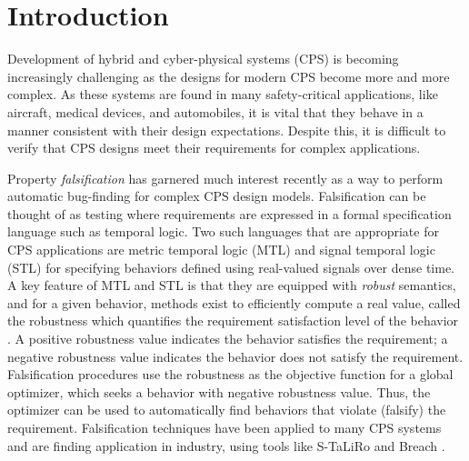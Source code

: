 \section{Introduction} \label{sec:introduction}

Development of hybrid and cyber-physical systems (CPS) is becoming
increasingly challenging as the designs for modern CPS become more and
more complex.  As these systems are found in many safety-critical
applications, like aircraft, medical devices, and automobiles, it is
vital that they behave in a manner consistent with their
design expectations. Despite this, it is difficult to verify that CPS
designs meet their requirements for complex applications.

Property \emph{falsification} has garnered much interest recently as a
way to perform automatic bug-finding for complex CPS design
models. Falsification can be thought of as testing where requirements
are expressed in a formal specification language such as temporal
logic.  Two such languages that are appropriate for CPS applications
are metric temporal logic (MTL) and signal temporal logic (STL)
\cite{Koymans1990,MalerN04} for specifying behaviors defined using
real-valued signals over dense time. A key feature of MTL and STL is
that they are equipped with \emph{robust} semantics, and for a given
behavior, methods exist to efficiently compute a real value, called
the robustness which quantifies the requirement satisfaction level of
the behavior \cite{FainekosP06fates,DonzeM10}. A positive robustness
value indicates the behavior satisfies the requirement; a negative
robustness value indicates the behavior does not satisfy the
requirement. Falsification procedures use the robustness as the
objective function for a global optimizer, which seeks a behavior with
negative robustness value. Thus, the optimizer can be used to
automatically find behaviors that violate (falsify) the
requirement. Falsification techniques have been applied to many CPS
systems and are finding application in industry, using tools like
S-TaLiRo and Breach \cite{TaliroLFS11,BreachCAV10}.


